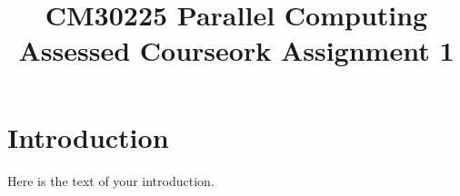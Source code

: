 \documentclass{article}
\begin{document}
\title{CM30225 Parallel Computing \\ Assessed Courseork Assignment 1}
\author{}

\maketitle

\section{Introduction}
Here is the text of your introduction.
\end{document}
